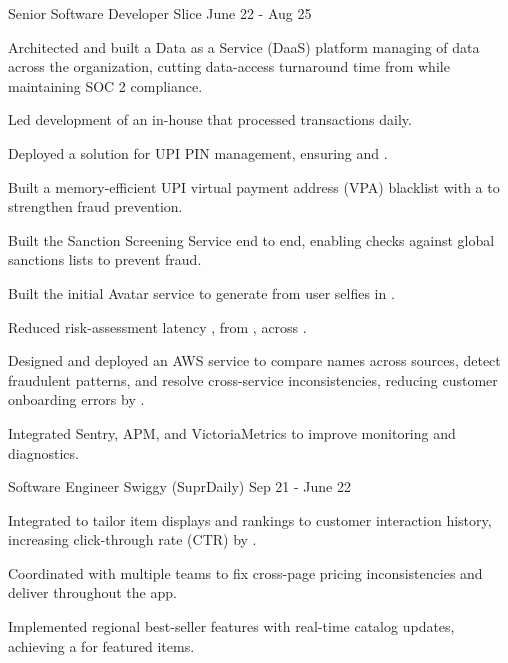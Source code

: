 \begin{cventries}
  \cventry
    {Senior Software Developer}
    {Slice}
    {June 22 - Aug 25}
    {}
    {
      \begin{cvitems}
        \item {Architected and built a Data as a Service (DaaS) platform managing  of data across the organization,
        cutting data-access turnaround time from  while maintaining SOC 2 compliance.}
        \item {Led development of an in-house  that processed  transactions daily.}
        \item {Deployed a  solution for UPI PIN management, ensuring  and .}
        \item {Built a memory-efficient UPI virtual payment address (VPA) blacklist with a  to strengthen fraud prevention.}
        \item {Built the Sanction Screening Service end to end, enabling checks against  global sanctions lists to prevent fraud.}
        \item {Built the initial Avatar service to generate  from user selfies in .}
        \item {Reduced risk-assessment latency , from , across .}
        \item {Designed and deployed an AWS  service to compare names across sources, detect fraudulent patterns, and resolve cross-service inconsistencies, reducing customer onboarding errors by .}
        \item {Integrated Sentry, APM, and VictoriaMetrics to improve monitoring and diagnostics.}
      \end{cvitems}
    }
  
  \cventry
    {Software Engineer}
    {Swiggy (SuprDaily)}
    {Sep 21 - June 22}
    {}
    {
      \begin{cvitems}
        \item {Integrated  to tailor item displays and rankings to customer interaction history,
          increasing click-through rate (CTR) by .}
        \item {Coordinated with multiple teams to fix cross-page pricing inconsistencies
          and deliver  throughout the app.}
        \item {Implemented regional best-seller features with real-time catalog updates, achieving a  for featured items.}
      \end{cvitems}
    }
  

\end{cventries}
